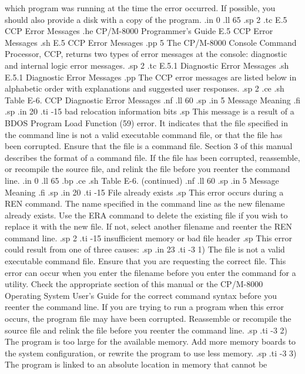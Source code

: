 which program was running at the time the error occurred.  If possible, 
you should also provide a disk with a copy of the program.
.in 0
.ll 65
.sp 2
.tc    E.5  CCP Error Messages
.he CP/M-8000 Programmer's Guide               E.5  CCP Error Messages
.sh
E.5  CCP Error Messages
.pp 5
The CP/M-8000 Console Command Processor, CCP, returns two types of 
error messages at the console:  diagnostic and internal logic 
error messages.  
.sp 2
.tc         E.5.1  Diagnostic Error Messages
.sh
E.5.1  Diagnostic Error Messages
.pp
The CCP error messages are listed below in alphabetic order
with explanations and suggested user responses.
.sp 2
.ce
.sh
Table E-6.  CCP Diagnostic Error Messages
.nf
.ll 60
.sp
.in 5
Message        Meaning
.fi
.sp
.in 20
.ti -15
bad relocation information bits
.sp
This message is a result of a BDOS Program Load Function 
(59) error.  It indicates that the file specified in the command line is 
not a valid 
executable command file, or that the file has been corrupted.  Ensure that 
the file is a command file.  Section 3 of this manual
describes the format of a command file.  If the file has been 
corrupted, reassemble, or recompile the source file, and relink the file before you reenter 
the command line.
.in 0
.ll 65
.bp
.ce
.sh
Table E-6.  (continued)
.nf
.ll 60
.sp
.in 5
Message        Meaning
.fi
.sp
.in 20
.ti -15
File already exists
.sp
This error occurs during a REN command.  The name specified in the
command line as the new filename already exists.  Use the ERA command to 
delete the existing file if you 
wish to replace it with the new file.
If not, select another filename and reenter the REN command line.
.sp 2
.ti -15
insufficient memory or bad file header
.sp
This error could result from one of three causes:  
.sp
.in 23
.ti -3
1) The file is not a valid executable command file.  Ensure that you are 
requesting the correct file.  This error can occur
when you enter the filename before you enter the command for a 
utility.  Check the appropriate section of this manual or the 
CP/M-8000 Operating System User's Guide for the correct
command syntax before you reenter the command line.  If you are trying to run
a program when this error occurs, the program file may
have been corrupted.  Reassemble or recompile the source file 
and relink the file before you reenter the command line.  
.sp
.ti -3
2) The program is too large for the available memory.  Add more memory boards 
to the system configuration, or rewrite the 
program to use less memory.  
.sp
.ti -3
3) The program is linked to an absolute location in memory that cannot be 
